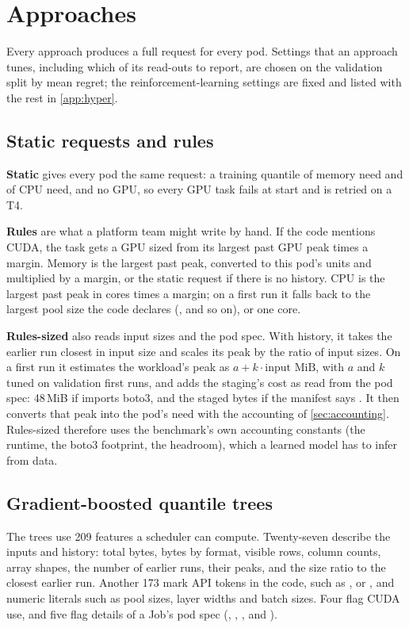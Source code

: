 \section{Approaches}
\label{sec:methods}

Every approach produces a full request for every pod. Settings that an approach tunes, including which of its
read-outs to report, are chosen on the validation split by mean regret; the reinforcement-learning settings are
fixed and listed with the rest in \cref{app:hyper}.

\subsection{Static requests and rules}
\textbf{Static} gives every pod the same request: a training quantile of memory need and of CPU need, and no
GPU, so every GPU task fails at start and is retried on a T4.

\textbf{Rules} are what a platform team might write by hand. If the code mentions CUDA, the task gets a GPU sized
from its largest past GPU peak times a margin. Memory is the largest past peak, converted to this pod's units and
multiplied by a margin, or the static request if there is no history. CPU is the largest past peak in cores times
a margin; on a first run it falls back to the largest pool size the code declares (,
 and so on), or one core.

\textbf{Rules-sized} also reads input sizes and the pod spec. With history, it takes the earlier run closest in
input size and scales its peak by the ratio of input sizes. On a first run it estimates the workload's peak as
$a + k\cdot\text{input MiB}$, with $a$ and $k$ tuned on validation first runs, and adds the staging's cost as read
from the pod spec: 48\,MiB if  imports boto3, and the staged bytes if the manifest says
. It then converts that peak into the pod's need with the accounting of
\cref{sec:accounting}. Rules-sized therefore uses the benchmark's own accounting constants (the runtime, the
boto3 footprint, the headroom), which a learned model has to infer from data.

\subsection{Gradient-boosted quantile trees}
The trees use 209 features a scheduler can compute. Twenty-seven describe the inputs and history: total bytes,
bytes by format, visible rows, column counts, array shapes, the number of earlier runs, their peaks, and the size
ratio to the closest earlier run. Another 173 mark API tokens in the code, such as ,
 or , and numeric literals such as pool sizes, layer widths and
batch sizes. Four flag CUDA use, and five flag details of a Job's pod spec (,
, ,  and ).


